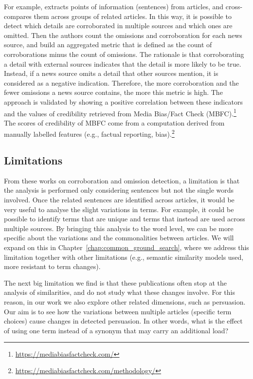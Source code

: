 For example, \citet{bountouridis2018explaining} extracts points of information (sentences) from articles, and cross-compares them across groups of related articles. In this way, it is possible to detect which details are corroborated in multiple sources and which ones are omitted.
Then the authors count the omissions and corroboration for each news source, and build an aggregated metric that is defined as the count of corroborations minus the count of omissions.
The rationale is that corroborating a detail with external sources indicates that the detail is more likely to be true.
Instead, if a news source omits a detail that other sources mention, it is considered as a negative indication.
Therefore, the more corroboration and the fewer omissions a news source contains, the more this metric is high.
The approach is validated by showing a positive correlation between these indicators and the values of credibility retrieved from Media Bias/Fact Check (MBFC).\footnote{\url{https://mediabiasfactcheck.com/}}
The scores of credibility of MBFC come from a computation derived from manually labelled features (e.g., factual reporting, bias).\footnote{\url{https://mediabiasfactcheck.com/methodology/}}

\subsection{\statusgreen Limitations}

From these works on corroboration and omission detection, a limitation is that the analysis is performed only considering sentences but not the single words involved.
Once the related sentences are identified across articles, it would be very useful to analyse the slight variations in terms.
For example, it could be possible to identify terms that are unique and terms that instead are used across multiple sources. By bringing this analysis to the word level, we can be more specific about the variations and the commonalities between articles.
We will expand on this in Chapter~\ref{chap:common_ground_search}, where we address this limitation together with other limitations (e.g., semantic similarity models used, more resistant to term changes).

The next big limitation we find is that these publications often stop at the analysis of similarities, and do not study what these changes involve.
For this reason, in our work we also explore other related dimensions, such as persuasion.
Our aim is to see how the variations between multiple articles (specific term choices) cause changes in detected persuasion. In other words, what is the effect of using one term instead of a synonym that may carry an additional load?


